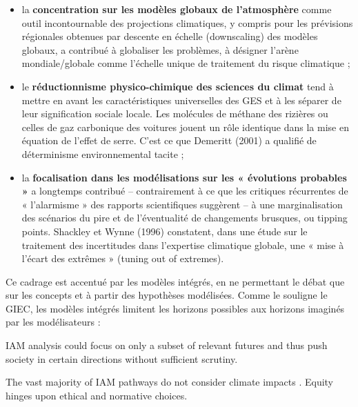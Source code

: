 \begin{authoredquote}
    \begin{itemize}
    \item la \textbf{concentration sur les modèles globaux de l’atmosphère} comme outil incontournable des projections climatiques, y compris pour les prévisions régionales obtenues par descente en échelle (downscaling) des modèles globaux, a contribué à globaliser les problèmes, à désigner l’arène mondiale/globale comme l’échelle unique de traitement du risque climatique ;
	\item le \textbf{réductionnisme physico-chimique des sciences du climat} tend à mettre en avant les caractéristiques universelles des GES et à les séparer de leur signification sociale locale. Les molécules de méthane des rizières ou celles de gaz carbonique des voitures jouent un rôle identique dans la mise en équation de l’effet de serre. C’est ce que Demeritt (2001) a qualifié de déterminisme environnemental tacite ;
	\item la \textbf{focalisation dans les modélisations sur les « évolutions probables »} a longtemps contribué – contrairement à ce que les critiques récurrentes de « l’alarmisme » des rapports scientifiques suggèrent – à une marginalisation des scénarios du pire et de l’éventualité de changements brusques, ou tipping points. Shackley et Wynne (1996) constatent, dans une étude sur le traitement des incertitudes dans l’expertise climatique globale, une « mise à l’écart des extrêmes » (tuning out of extremes).
\end{itemize}



\end{authoredquote}

Ce cadrage est accentué par les modèles intégrés, en ne permettant le débat que sur les concepts et à partir des hypothèses modélisées. Comme le souligne le GIEC, les modèles intégrés limitent les horizons possibles aux horizons imaginés par les modélisateurs : 

\begin{authoredquote}
    IAM analysis could focus on only a subset of relevant futures and thus push society in certain directions without sufficient scrutiny. 
\end{authoredquote}

\begin{authoredquote}
    The vast majority of IAM pathways do not consider climate impacts . Equity hinges upon ethical and normative choices. 
\end{authoredquote}

